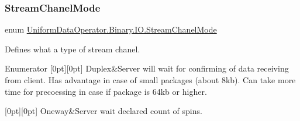 \subsubsection{\texorpdfstring{Stream\+Chanel\+Mode}{StreamChanelMode}}
{\footnotesize\ttfamily enum \mbox{\hyperlink{namespace_uniform_data_operator_1_1_binary_1_1_i_o_a3fee9a9bcba25974554ed63395942161}{Uniform\+Data\+Operator.\+Binary.\+I\+O.\+Stream\+Chanel\+Mode}}\hspace{0.3cm}{\ttfamily [strong]}}



Defines what a type of stream chanel. 

\begin{DoxyEnumFields}{Enumerator}
[0pt][0pt]{}\mbox{\label{namespace_uniform_data_operator_1_1_binary_1_1_i_o_a3fee9a9bcba25974554ed63395942161acfefe70df0902a80bb48b04ff12a7436}} 
Duplex&Server will wait for confirming of data receiving from client. Has advantage in case of small packages (about 8kb). Can take more time for precoessing in case if package is 64kb or higher. \\
\hline

[0pt][0pt]{}\mbox{\label{namespace_uniform_data_operator_1_1_binary_1_1_i_o_a3fee9a9bcba25974554ed63395942161ab6f2b2a3b9675cbd2f00f92c5bd93dd4}} 
Oneway&Server wait declared count of spins. \\
\hline

\end{DoxyEnumFields}

